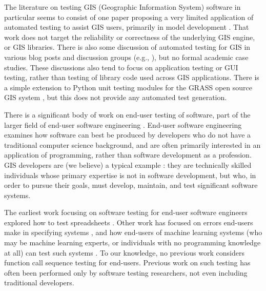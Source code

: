The literature on testing GIS (Geographic Information System) software
in particular seems to consist of one paper proposing a very limited
application of automated testing to assist GIS users, primarily in
model development \cite{GISTest}.  That work does not target the
reliability or correctness of the underlying GIS engine, or GIS
libraries.  There is also some discussion of automated testing for GIS
in various blog posts and discussion groups (e.g.,
\cite{gisblog1,gisblog2}), but no formal academic case studies.  These
discussions also tend to focus on application testing or GUI testing,
rather than testing of library code used across GIS applications.
There is a simple extension to Python unit testing modules for the
GRASS open source GIS system \cite{GRASSunit}, but this does not
provide any automated test generation.

There is a significant body of work on end-user testing of software,
part of the larger field of end-user software engineering
\cite{burnettEUSE,Silos}.  End-user software engineering examines how
software can best be produced by developers who do not have a
traditional computer science background, and are often primarily
interested in an application of programming, rather than software
development as a profession.  GIS developers are (we believe) a
typical example \cite{Segal07}:  they are technically skilled  individuals whose
primary expertise is not in software development, but who, in order to
pursue their goals, must develop, maintain, and test significant
software systems.

The earliest work focusing on software testing for
end-user software engineers explored how to test spreadsheets
\cite{rothermelTOSEM,rothermel2000wysiwyt}.  Other work has focused on
errors end-users make in specifying systems \cite{Phalgune}, and how
end-users of machine learning systems (who may be machine learning
experts, or individuals with no programming knowledge at all) can test
such systems \cite{OnlyOracle,kulesza-eud11,shinsel-vlhcc}.  To our
knowledge, no previous work considers function call sequence testing for
end-users.  Previous work on such testing has often been performed
only by software testing researchers, not even including traditional developers.

